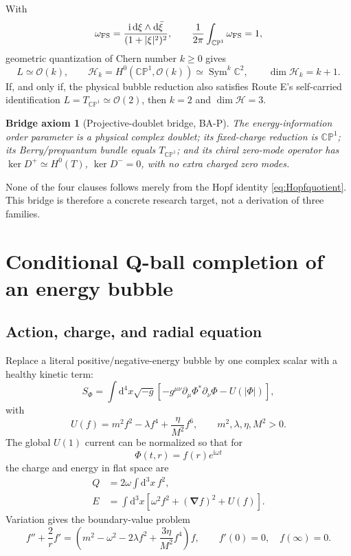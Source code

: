 \documentclass[11pt]{article}
\numberwithin{equation}{section}
\newcommand{\CP}{\mathbb{CP}}
\newcommand{\cO}{\mathcal O}
\newcommand{\dd}{\mathrm d}
\newcommand{\ii}{\mathrm i}
\newtheorem{assumption}[theorem]{Bridge axiom}
\begin{document}
With
\begin{equation}
 \omega_{\rm FS}=\frac{\ii\,\dd\xi\wedge\dd\bar\xi}
 {(1+|\xi|^2)^2},
 \qquad \frac1{2\pi}\int_{\CP^1}\omega_{\rm FS}=1,
\end{equation}
geometric quantization of Chern number \(k\ge0\) gives
\begin{equation}
 L\simeq\cO(k),\qquad
 \mathcal H_k=H^0(\CP^1,\cO(k))
 \simeq\operatorname{Sym}^k\mathbb C^2,
 \qquad \dim\mathcal H_k=k+1.
 \label{eq:geomquant}
\end{equation}
If, and only if, the physical bubble reduction also satisfies Route E's
self-carried identification \(L=T_{\CP^1}\simeq\cO(2)\), then \(k=2\) and
\(\dim\mathcal H=3\).

\begin{assumption}[Projective-doublet bridge, BA-P]
The energy-information order parameter is a physical complex doublet; its
fixed-charge reduction is \(\CP^1\); its Berry/prequantum bundle equals
\(T_{\CP^1}\); and its chiral zero-mode operator has
\(\ker D^+\simeq H^0(T)\), \(\ker D^-=0\), with no extra charged zero modes.
\end{assumption}

None of the four clauses follows merely from the Hopf identity
\eqref{eq:Hopfquotient}.  This bridge is therefore a concrete research target,
not a derivation of three families.

\section{Conditional Q-ball completion of an energy bubble}

\subsection{Action, charge, and radial equation}

Replace a literal positive/negative-energy bubble by one complex scalar with a
healthy kinetic term:
\begin{equation}
 S_\Phi=\int\dd^4x\sqrt{-g}\left[
 -g^{\mu\nu}\partial_\mu\Phi^*\partial_\nu\Phi-U(|\Phi|)
 \right],
 \label{eq:qballaction}
\end{equation}
with
\begin{equation}
 U(f)=m^2f^2-\lambda f^4+\frac{\eta}{M^2}f^6,
 \qquad m^2,\lambda,\eta,M^2>0.
 \label{eq:qballpotential}
\end{equation}
The global \(U(1)\) current can be normalized so that for
\begin{equation}
 \Phi(t,r)=f(r)e^{\ii\omega t}
\end{equation}
the charge and energy in flat space are
\begin{align}
 Q&=2\omega\int\dd^3x\,f^2,\label{eq:qcharge}\\
 E&=\int\dd^3x\left[\omega^2f^2+(\bm\nabla f)^2+U(f)\right].
 \label{eq:qenergy}
\end{align}
Variation gives the boundary-value problem
\begin{equation}
 f''+\frac2r f'=\left(m^2-\omega^2-2\lambda f^2
 +\frac{3\eta}{M^2}f^4\right)f,
 \qquad f'(0)=0,\quad f(\infty)=0.
 \label{eq:qballode}
\end{equation}
\end{document}
